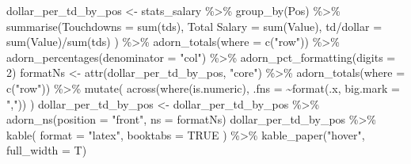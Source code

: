 \documentclass[
  letterpaper,
  DIV=11,
  numbers=noendperiod]{scrartcl}
\newenvironment{Shaded}{\begin{snugshade}}{\end{snugshade}}
\newcommand{\AttributeTok}[1]{\textcolor[rgb]{0.40,0.45,0.13}{#1}}
\newcommand{\ConstantTok}[1]{\textcolor[rgb]{0.56,0.35,0.01}{#1}}
\newcommand{\DecValTok}[1]{\textcolor[rgb]{0.68,0.00,0.00}{#1}}
\newcommand{\FunctionTok}[1]{\textcolor[rgb]{0.28,0.35,0.67}{#1}}
\newcommand{\NormalTok}[1]{\textcolor[rgb]{0.00,0.23,0.31}{#1}}
\newcommand{\OtherTok}[1]{\textcolor[rgb]{0.00,0.23,0.31}{#1}}
\newcommand{\SpecialCharTok}[1]{\textcolor[rgb]{0.37,0.37,0.37}{#1}}
\newcommand{\StringTok}[1]{\textcolor[rgb]{0.13,0.47,0.30}{#1}}
\begin{document}
\begin{Shaded}
\begin{Highlighting}[]
\NormalTok{dollar\_per\_td\_by\_pos }\OtherTok{\textless{}{-}}\NormalTok{ stats\_salary }\SpecialCharTok{\%\textgreater{}\%}
  \FunctionTok{group\_by}\NormalTok{(Pos) }\SpecialCharTok{\%\textgreater{}\%}
  \FunctionTok{summarise}\NormalTok{(}\AttributeTok{Touchdowns =} \FunctionTok{sum}\NormalTok{(tds),}
            \StringTok{\textasciigrave{}}\AttributeTok{Total Salary}\StringTok{\textasciigrave{}} \OtherTok{=} \FunctionTok{sum}\NormalTok{(Value),}
            \StringTok{\textasciigrave{}}\AttributeTok{td/dollar}\StringTok{\textasciigrave{}} \OtherTok{=} \FunctionTok{sum}\NormalTok{(Value)}\SpecialCharTok{/}\FunctionTok{sum}\NormalTok{(tds)}
\NormalTok{  ) }\SpecialCharTok{\%\textgreater{}\%}
  \FunctionTok{adorn\_totals}\NormalTok{(}\AttributeTok{where =} \FunctionTok{c}\NormalTok{(}\StringTok{"row"}\NormalTok{)) }\SpecialCharTok{\%\textgreater{}\%}
  \FunctionTok{adorn\_percentages}\NormalTok{(}\AttributeTok{denominator =} \StringTok{"col"}\NormalTok{) }\SpecialCharTok{\%\textgreater{}\%}
  \FunctionTok{adorn\_pct\_formatting}\NormalTok{(}\AttributeTok{digits =} \DecValTok{2}\NormalTok{)}
\NormalTok{formatNs }\OtherTok{\textless{}{-}} \FunctionTok{attr}\NormalTok{(dollar\_per\_td\_by\_pos, }\StringTok{"core"}\NormalTok{) }\SpecialCharTok{\%\textgreater{}\%}
  \FunctionTok{adorn\_totals}\NormalTok{(}\AttributeTok{where =} \FunctionTok{c}\NormalTok{(}\StringTok{"row"}\NormalTok{)) }\SpecialCharTok{\%\textgreater{}\%}
  \FunctionTok{mutate}\NormalTok{(}
    \FunctionTok{across}\NormalTok{(}\FunctionTok{where}\NormalTok{(is.numeric), }\AttributeTok{.fns =} \SpecialCharTok{\textasciitilde{}}\FunctionTok{format}\NormalTok{(.x, }\AttributeTok{big.mark =} \StringTok{","}\NormalTok{))}
\NormalTok{  )}
\NormalTok{dollar\_per\_td\_by\_pos }\OtherTok{\textless{}{-}}\NormalTok{ dollar\_per\_td\_by\_pos }\SpecialCharTok{\%\textgreater{}\%}
  \FunctionTok{adorn\_ns}\NormalTok{(}\AttributeTok{position =} \StringTok{"front"}\NormalTok{, }\AttributeTok{ns =}\NormalTok{ formatNs)}
\NormalTok{dollar\_per\_td\_by\_pos }\SpecialCharTok{\%\textgreater{}\%} \FunctionTok{kable}\NormalTok{(}
  \AttributeTok{format =} \StringTok{"latex"}\NormalTok{,}
  \AttributeTok{booktabs =} \ConstantTok{TRUE}
\NormalTok{) }\SpecialCharTok{\%\textgreater{}\%}
  \FunctionTok{kable\_paper}\NormalTok{(}\StringTok{"hover"}\NormalTok{, }\AttributeTok{full\_width =}\NormalTok{ T)}


\end{Highlighting}
\end{Shaded}
\end{document}
